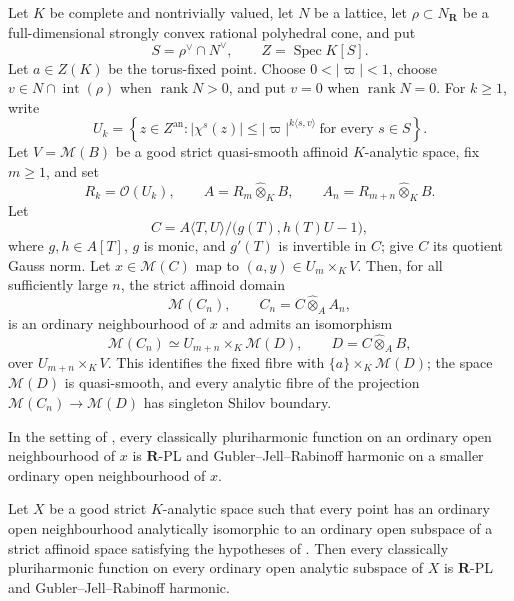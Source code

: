 \begin{proposition}
\label{prop:p061-analytic-standard-etale-toric-product}
Let \(K\) be complete and nontrivially valued, let \(N\) be a lattice, let
\(\rho\subset N_{\mathbf R}\) be a full-dimensional strongly convex rational
polyhedral cone, and put
\[
 S=\rho^\vee\cap N^\vee,
 \qquad Z=\operatorname{Spec}K[S].
\]
Let \(a\in Z(K)\) be the torus-fixed point.  Choose
\(0<|\varpi|<1\), choose \(v\in N\cap\operatorname{int}(\rho)\) when
\(\operatorname{rank}N>0\), and put \(v=0\) when
\(\operatorname{rank}N=0\).  For \(k\geq1\), write
\[
 U_k=\left\{z\in Z^{\mathrm{an}}:
  |\chi^s(z)|\leq|\varpi|^{k\langle s,v\rangle}
  \ \text{for every }s\in S\right\}.
\]
Let \(V=\mathcal M(B)\) be a good strict quasi-smooth affinoid
\(K\)-analytic space, fix \(m\geq1\), and set
\[
 R_k=\mathcal O(U_k),\qquad
 A=R_m\widehat\otimes_KB,
 \qquad A_n=R_{m+n}\widehat\otimes_KB.
\]
Let
\[
 C=A\langle T,U\rangle/\bigl(g(T),h(T)U-1\bigr),
\]
where \(g,h\in A[T]\), \(g\) is monic, and \(g'(T)\) is invertible in
\(C\); give \(C\) its quotient Gauss norm.  Let \(x\in\mathcal M(C)\)
map to \((a,y)\in U_m\times_KV\).  Then, for all sufficiently large
\(n\), the strict affinoid domain
\[
 \mathcal M(C_n),\qquad C_n=C\widehat\otimes_AA_n,
\]
is an ordinary neighbourhood of \(x\) and admits an isomorphism
\[
 \mathcal M(C_n)\simeq U_{m+n}\times_K\mathcal M(D),
 \qquad D=C\widehat\otimes_AB,
\]
over \(U_{m+n}\times_KV\).  This identifies the fixed fibre with
\(\{a\}\times_K\mathcal M(D)\); the space \(\mathcal M(D)\) is
quasi-smooth, and every analytic fibre of the projection
\(\mathcal M(C_n)\to\mathcal M(D)\) has singleton Shilov boundary.
\end{proposition}

\begin{theorem}
\label{thm:p061-analytic-standard-etale-toroidal-ph-rpl}
In the setting of
, every classically
pluriharmonic function on an ordinary open neighbourhood of \(x\) is
\(\mathbf R\)-PL and Gubler--Jell--Rabinoff harmonic on a smaller ordinary
open neighbourhood of \(x\).
\end{theorem}

\begin{corollary}
\label{cor:p061-analytic-standard-etale-toroidal-charts}
Let \(X\) be a good strict \(K\)-analytic space such that every point has
an ordinary open neighbourhood analytically isomorphic to an ordinary open
subspace of a strict affinoid space satisfying the hypotheses of
.  Then every
classically pluriharmonic function on every ordinary open analytic subspace
of \(X\) is \(\mathbf R\)-PL and Gubler--Jell--Rabinoff harmonic.
\end{corollary}

